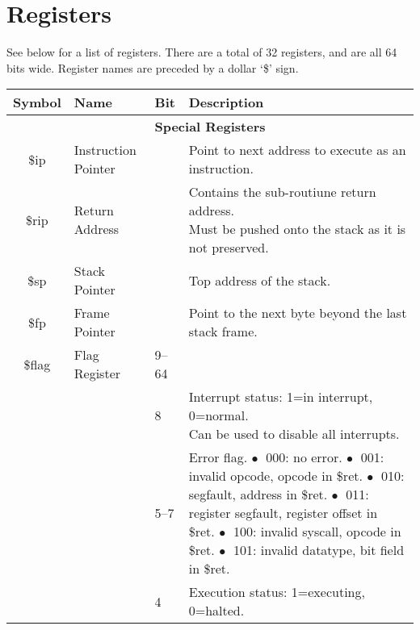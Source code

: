 \documentclass[10pt]{article}
\begin{document}
    \section{Registers}\label{sec:registers}

    See below for a list of registers.
    There are a total of 32 registers, and are all 64 bits wide.
    Register names are preceded by a dollar `\$' sign.

    \bigskip
    \begin{longtable}{|c|l|l|l|}
        \hline
        \textbf{Symbol} & \textbf{Name} & \textbf{Bit} & \textbf{Description} \\
        \hline
        \multicolumn{4}{|c|}{\textbf{Special Registers}} \\
        \hline
        \$ip & Instruction Pointer &  & Point to next address to execute as an instruction. \\
        \hline
        \$rip & Return Address &  & \makecell[l]{Contains the sub-routiune return address.\\%
        Must be pushed onto the stack as it is not preserved.} \\
        \hline
        \$sp & Stack Pointer &  & Top address of the stack. \\
        \hline
        \$fp & Frame Pointer &  & Point to the next byte beyond the last stack frame. \\
        \hline
        \$flag & Flag Register & 9--64 & \\
        \cline{3-4}
        & & 8 & \makecell[l]{Interrupt status: 1=in interrupt, 0=normal.\\%
        Can be used to disable all interrupts.} \\
        \cline{3-4}
        & & 5--7 & \makecell[l]{Error flag.\\%
        \(\bullet\;\) 000: no error.\\%
        \(\bullet\;\) 001: invalid opcode, opcode in \$ret.\\%
        \(\bullet\;\) 010: segfault, address in \$ret.\\%
        \(\bullet\;\) 011: register segfault, register offset in \$ret.\\%
        \(\bullet\;\) 100: invalid syscall, opcode in \$ret.\\%
        \(\bullet\;\) 101: invalid datatype, bit field in \$ret.\\%
        } \\
        \cline{3-4}
        & & 4 & \makecell[l]{Execution status: 1=executing, 0=halted.\\%
}
\end{longtable}
\end{document}
